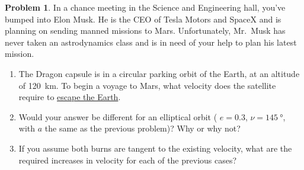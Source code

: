 \documentclass[10pt]{article}
\theoremstyle{definition}
\newtheorem{prob}{Problem}[section]
\newenvironment{subprob}%
{\renewcommand{\theenumi}{\alph{enumi}}\renewcommand{\labelenumi}{(\theenumi)}\begin{enumerate}}%
{\end{enumerate}}%
\begin{document}
\begin{prob}
    In a chance meeting in the Science and Engineering hall, you've bumped into Elon Musk.
    He is the CEO of Tesla Motors and SpaceX and is planning on sending manned missions to Mars.
    Unfortunately, Mr.~Musk has never taken an astrodynamics class and is in need of your help to plan his latest mission.
    \begin{subprob}
    \item The Dragon capsule is in a circular parking orbit of the Earth, at an altitude of \SI{120}{\kilo\meter}.
    To begin a voyage to Mars, what velocity does the satellite require to \underline{escape the Earth}.
    \item Would your answer be different for an elliptical orbit ( \( e = 0.3\), \( \nu = \SI{145}{\degree} \), with \( a \) the same as the previous problem)?
        Why or why not?
    \item If you assume both burns are tangent to the existing velocity, what are the required increases in velocity for each of the previous cases?
    \end{subprob}
\end{prob}
\end{document}
